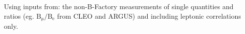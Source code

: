 \noindent Using inputs from: the non-B-Factory measurements of single quantities and ratios (eg. $\mathrm{B_\mu/B_e}$ from CLEO and ARGUS) and including leptonic correlations only.
